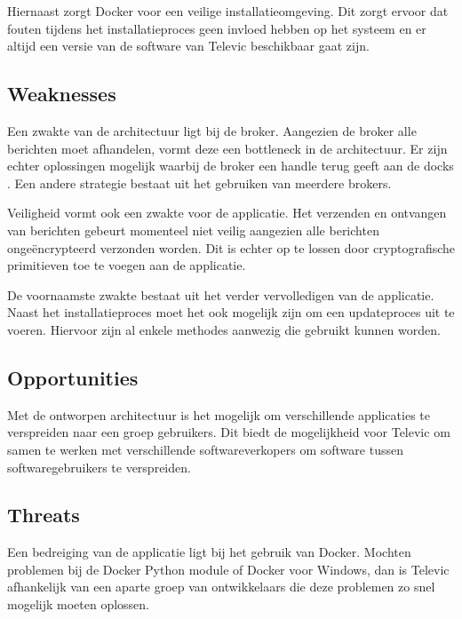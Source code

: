 Hiernaast zorgt Docker voor een veilige installatieomgeving.
Dit zorgt ervoor dat fouten tijdens het installatieproces geen invloed hebben op het systeem en er altijd een versie van de software van Televic beschikbaar gaat zijn.

\subsection{Weaknesses}
Een zwakte van de architectuur ligt bij de broker.
Aangezien de broker alle berichten moet afhandelen, vormt deze een bottleneck in de architectuur.
Er zijn echter oplossingen mogelijk waarbij de broker een handle terug geeft aan de docks \citep{adler1995distributed}. 
Een andere strategie bestaat uit het gebruiken van meerdere brokers.

Veiligheid vormt ook een zwakte voor de applicatie.
Het verzenden en ontvangen van berichten gebeurt momenteel niet veilig aangezien alle berichten ongeëncrypteerd verzonden worden.
Dit is echter op te lossen door cryptografische primitieven toe te voegen aan de applicatie.

De voornaamste zwakte bestaat uit het verder vervolledigen van de applicatie.
Naast het installatieproces moet het ook mogelijk zijn om een updateproces uit te voeren.
Hiervoor zijn al enkele methodes aanwezig die gebruikt kunnen worden.

\subsection{Opportunities}
Met de ontworpen architectuur is het mogelijk om verschillende applicaties te verspreiden naar een groep gebruikers.
Dit biedt de mogelijkheid voor Televic om samen te werken met verschillende softwareverkopers om software tussen softwaregebruikers te verspreiden.

\subsection{Threats}
Een bedreiging van de applicatie ligt bij het gebruik van Docker.
Mochten problemen bij de Docker Python module of Docker voor Windows, dan is Televic afhankelijk van een aparte groep van ontwikkelaars die deze problemen zo snel mogelijk moeten oplossen.


